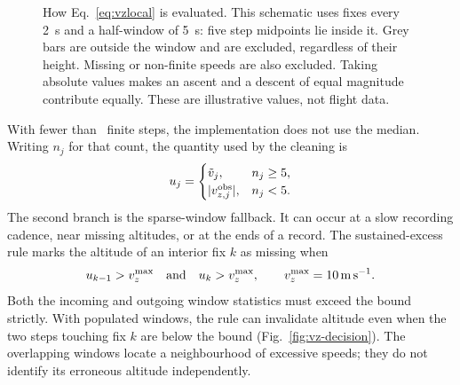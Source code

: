 \begin{revblock}
\begin{figure}[htbp]
  \caption{How Eq.~\eqref{eq:vzlocal} is evaluated. This schematic uses
  fixes every \SI{2}{\second} and a half-window of \SI{5}{\second}:
  five step midpoints lie inside it. Grey bars are outside the window and are
  excluded, regardless of their height. Missing or non-finite speeds are also
  excluded. Taking absolute values makes an ascent and a descent of equal
  magnitude contribute equally. These are illustrative values, not flight data.}
  \label{fig:vz-window}
\end{figure}

With fewer than \PreprocVzMinWindowFixes\ finite steps, the implementation does
not use the median. Writing $n_j$ for that count, the quantity used by the cleaning is
\[
 u_j=\begin{cases}
       \tilde v_j, & n_j\geq5,\\
       |v_{z,j}^{\mathrm{obs}}|, & n_j<5.
     \end{cases}
\]
The second branch is the sparse-window fallback. It can occur at a slow recording
cadence, near missing altitudes, or at the ends of a record. The sustained-excess
rule marks the altitude of an interior fix $k$ as missing when
\begin{equation}
  u_{k-1}>v_z^{\max}\quad\text{and}\quad u_k>v_z^{\max},
  \qquad v_z^{\max}=\SI{10}{\metre\per\second}.
  \label{eq:vz-censor}
\end{equation}
Both the incoming and outgoing window statistics must exceed the bound strictly.
With populated windows, the rule can invalidate altitude even when the two steps
touching fix $k$ are below the bound (Fig.~\ref{fig:vz-decision}). The overlapping
windows locate a neighbourhood of excessive speeds; they do not identify its
erroneous altitude independently.


\end{revblock}
